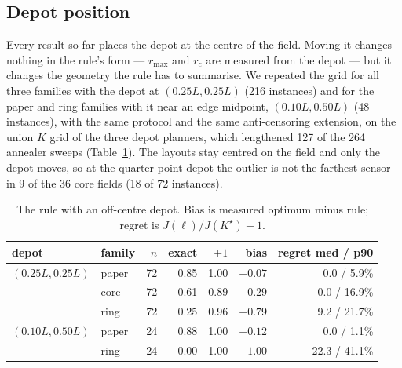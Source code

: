 \documentclass[journal,outdir=./]{IEEEtran}
\newcommand{\rmax}{r_{\max}}
\newcommand{\rc}{r_{c}}
\begin{document}
\subsection{Depot position}\label{sec:eval:depot}
Every result so far places the depot at the centre of the field. Moving it changes nothing in the rule's form --- $\rmax$ and $\rc$ are measured from the depot --- but it changes the geometry the rule has to summarise. We repeated the grid for all three families with the depot at $(0.25L,0.25L)$ (216 instances) and for the paper and ring families with it near an edge midpoint, $(0.10L,0.50L)$ (48 instances), with the same protocol and the same anti-censoring extension, on the union $K$ grid of the three depot planners, which lengthened 127 of the 264 annealer sweeps (Table~\ref{tab:depot}). The layouts stay centred on the field and only the depot moves, so at the quarter-point depot the outlier is not the farthest sensor in 9 of the 36 core fields (18 of 72 instances).

\begin{table}[t]\centering
\footnotesize\setlength{\tabcolsep}{3pt}
\caption{The rule with an off-centre depot. Bias is measured optimum minus rule; regret is $J(\ell)/J(K^\star)-1$.}
\label{tab:depot}
\begin{tabular}{llrrrrr}
\toprule
depot & family & $n$ & exact & $\pm1$ & bias & regret med / p90\\
\midrule
$(0.25L,0.25L)$ & paper & 72 & 0.85 & 1.00 & $+0.07$ & 0.0 / 5.9\%\\
 & core & 72 & 0.61 & 0.89 & $+0.29$ & 0.0 / 16.9\%\\
 & ring & 72 & 0.25 & 0.96 & $-0.79$ & 9.2 / 21.7\%\\
\midrule
$(0.10L,0.50L)$ & paper & 24 & 0.88 & 1.00 & $-0.12$ & 0.0 / 1.1\%\\
 & ring & 24 & 0.00 & 1.00 & $-1.00$ & 22.3 / 41.1\%\\
\bottomrule
\end{tabular}
\end{table}
\end{document}
